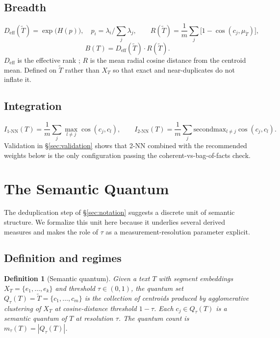 \documentclass[11pt]{article}
\newtheorem{definition}{Definition}
\begin{document}
\subsection{Breadth}
\[
D_{\mathrm{eff}}(\tilde{T}) = \exp\bigl(H(p)\bigr), \quad p_i = \lambda_i / {\textstyle\sum_j} \lambda_j,
\qquad
R(\tilde{T}) = \frac{1}{m} \sum_{j} \bigl[1 - \cos(c_j, \mu_{\tilde{T}})\bigr],
\]
\[
B(T) = D_{\mathrm{eff}}(\tilde{T}) \cdot R(\tilde{T}).
\]
$D_{\mathrm{eff}}$ is the effective rank \cite{roy2007effective}; $R$ is the mean radial cosine distance from the centroid mean. Defined on $\tilde{T}$ rather than $X_T$ so that exact and near-duplicates do not inflate it.

\subsection{Integration}
\[
I_{1\text{-NN}}(T) = \frac{1}{m} \sum_j \max_{l \neq j} \cos(c_j, c_l), \qquad
I_{2\text{-NN}}(T) = \frac{1}{m} \sum_j \mathrm{secondmax}_{l \neq j} \cos(c_j, c_l).
\]
Validation in \S\ref{sec:validation} shows that 2-NN combined with the recommended weights below is the only configuration passing the coherent-vs-bag-of-facts check.

\section{The Semantic Quantum}\label{sec:quantum}

The deduplication step of \S\ref{sec:notation} suggests a discrete unit of semantic structure. We formalize this unit here because it underlies several derived measures and makes the role of $\tau$ as a measurement-resolution parameter explicit.

\subsection{Definition and regimes}

\begin{definition}[Semantic quantum]\label{def:quantum}
Given a text $T$ with segment embeddings $X_T = \{e_1, \dots, e_k\}$ and threshold $\tau \in (0,1)$, the \emph{quantum set} $Q_\tau(T) = \tilde{T} = \{c_1, \dots, c_m\}$ is the collection of centroids produced by agglomerative clustering of $X_T$ at cosine-distance threshold $1 - \tau$. Each $c_j \in Q_\tau(T)$ is a \emph{semantic quantum} of $T$ at resolution $\tau$. The \emph{quantum count} is $m_\tau(T) = |Q_\tau(T)|$.
\end{definition}
\end{document}
